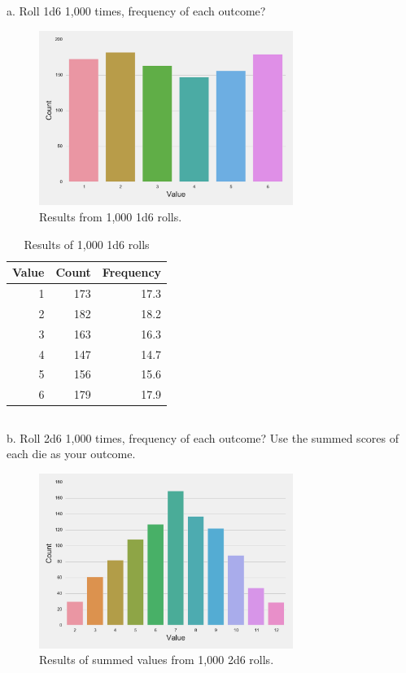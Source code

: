 \documentclass[twocolumn,letterpaper]{article}  %
\begin{document}
\subsection{}
a. Roll 1d6 1,000 times, frequency of each outcome?
\begin{figure}[h!]
\centering
\includegraphics[width=3.25in]{1d6.pdf}
\caption{Results from 1,000 1d6 rolls.}
\end{figure}

\begin{table}[h!]
\begin{center}
\begin{tabular}{*{3}{r}}
\toprule
Value & Count & Frequency \\
\midrule
 1   & 173      & 17.3 \\
 2   & 182      & 18.2 \\
 3   & 163      & 16.3 \\
 4   & 147      & 14.7 \\
 5   & 156      & 15.6 \\
 6   & 179      & 17.9 \\
\bottomrule
\end{tabular}
\end{center}
\caption{Results of 1,000 1d6 rolls}
\end{table}

\subsection{}
b. Roll 2d6 1,000 times, frequency of each outcome? Use the summed scores of each die as your outcome.
\begin{figure}[h!]
\centering
\includegraphics[width=3.25in]{2d6.pdf}
\caption{Results of summed values from 1,000 2d6 rolls.}
\end{figure}
\end{document}
